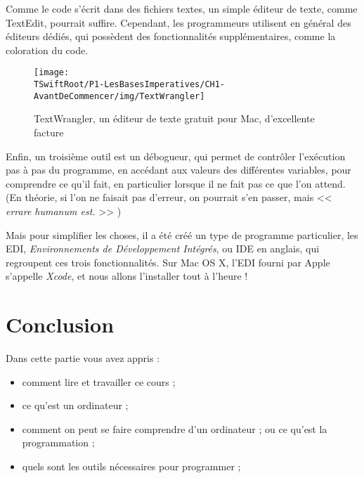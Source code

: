 Comme le code s'écrit dans des fichiers textes, un simple éditeur de texte,
comme TextEdit, pourrait suffire.
Cependant, les programmeurs utilisent en général des éditeurs dédiés,
qui possèdent des fonctionnalités supplémentaires, comme la coloration du code.
\begin{figure}[H]
\centering
\texttt{[image: \\TSwiftRoot/P1-LesBasesImperatives/CH1-AvantDeCommencer/img/TextWrangler]}
\caption{TextWrangler, un éditeur de texte gratuit pour Mac, d'excellente facture}
\end{figure}

Enfin, un troisième outil est un débogueur,
qui permet de contrôler l'exécution pas à pas du programme,
en accédant aux valeurs des différentes variables,
pour comprendre ce qu'il fait,
en particulier lorsque il ne fait pas ce que l'on attend.
(En théorie, si l'on ne faisait pas d'erreur,
on pourrait s'en passer,
mais << \emph{errare humanum est.} >> )

Mais pour simplifier les choses, il a été créé un type de programme particulier,
les EDI, \emph{Environnements de Développement Intégrés}, ou IDE en anglais,
qui regroupent ces trois fonctionnalités.
Sur Mac OS X, l'EDI fourni par Apple s'appelle \emph{Xcode},
et nous allons l'installer tout à l'heure !

\section*{Conclusion}
{}
Dans cette partie vous avez appris :
\begin{itemize}
\item comment lire et travailler ce cours ;
\item ce qu'est un ordinateur ;
\item comment on peut se faire comprendre d'un ordinateur ;
ou ce qu'est la programmation ;
\item quels sont les outils nécessaires pour programmer ;
\end{itemize}
